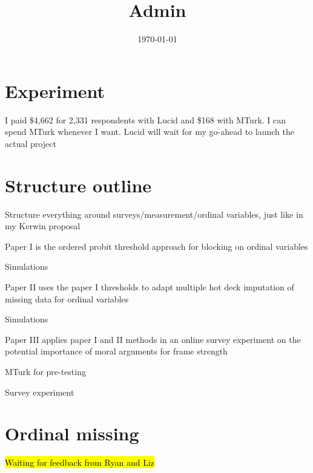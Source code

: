 

\title{Admin}

\date{\today}



\maketitle


\section*{Experiment}
	\begin{coi}
		\item I paid \$4,662 for 2,331 respondents with Lucid and \$168 with MTurk. I can spend MTurk whenever I want. Lucid will wait for my go-ahead to launch the actual project
	\end{coi}	
	
\section*{Structure outline}
	\begin{coi}
		\item Structure everything around surveys/measurement/ordinal variables, just like in my Kerwin proposal
		\item Paper I is the ordered probit threshold approach for blocking on ordinal variables
			\begin{coi}
				\item Simulations
			\end{coi}
		\item Paper II uses the paper I thresholds to adapt multiple hot deck imputation of missing data for ordinal variables
			\begin{coi}
				\item Simulations
			\end{coi}
		\item Paper III applies paper I and II methods in an online survey experiment on the potential importance of moral arguments for frame strength
			\begin{coi}
				\item MTurk for pre-testing
				\item Survey experiment
			\end{coi}
	\end{coi}


\section*{Ordinal missing}
	\begin{coi}
		\item \hl{Waiting for feedback from Ryan and Liz}
	\end{coi}
	
